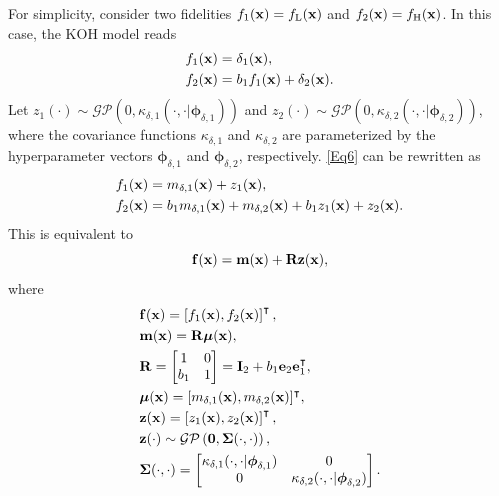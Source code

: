 \documentclass[iicol,sn-basic]{sn-jnl}%
\begin{document}
For simplicity, consider two fidelities $f_{1}({\bf x})=f_\text{L}({\bf x})$ and $f_{2}({\bf x})=f_\text{H}({\bf x})$.
In this case, the KOH model reads
\begin{subequations}\label{Eq6}
	\begin{align}
		f_1({\bf x}) & = \delta_1({\bf x}) 
		\label{Eq6-1},\\
		f_2({\bf x}) & = b_{1} f_{1}({\bf x}) + \delta_2({\bf x})
		\label{Eq6-2}.
	\end{align}
\end{subequations}
Let $z_1({\cdot}) \sim \mathcal{GP}\left(0,\kappa_{\delta,1}(\cdot,\cdot|{\boldsymbol \phi}_{\delta,1})\right)$ and $z_2({\cdot}) \sim \mathcal{GP}\left(0,\kappa_{\delta,2}(\cdot,\cdot|{\boldsymbol \phi}_{\delta,2})\right)$, where the covariance functions $\kappa_{\delta,1}$ and $\kappa_{\delta,2}$ are parameterized by the hyperparameter vectors ${\boldsymbol \phi}_{\delta,1}$ and ${\boldsymbol \phi}_{\delta,2}$, respectively.
\cref{Eq6} can be rewritten as
\begin{subequations}\label{Eq7}
	\begin{align}
		f_1({\bf x}) & = m_{\delta,1}({\bf x}) + z_1({\bf x}) 
		\label{Eq7-1},\\
		f_2({\bf x}) & = b_1  m_{\delta,1}({\bf x}) + m_{\delta,2}({\bf x}) + b_1 z_1({\bf x}) + z_2({\bf x})
		\label{Eq7-2}.
	\end{align}
\end{subequations}
This is equivalent to
\begin{equation}\label{Eq8}
	{\bf f}({\bf x}) =  {\bf m}({\bf x}) + {\bf R} {\bf z}({\bf x}),
\end{equation}
where
\begin{subequations}\label{Eq9}
	\begin{align}
		&{\bf f}({\bf x}) = \left[f_1({\bf x}),f_2({\bf x})\right]^\intercal 
		\label{Eq9-1},\\
		& {\bf m}({\bf x}) = {\bf R} \boldsymbol{\mu}({\bf x}), \label{Eq9-2}\\
		& {\bf R} = \left[\begin{matrix}
			1 & 0 \\
			b_1 & 1
		\end{matrix}\right] = {\bf I}_2 + b_1 {\bf e}_2 {\bf e}^\intercal_1, \label{Eq9-3}\\
		& \boldsymbol{\mu}({\bf x}) = [m_{\delta,1}({\bf x}),m_{\delta,2}({\bf x})]^\intercal,
		\label{Eq9-4}\\
		& {\bf z}({\bf x}) = \left[z_1({\bf x}),z_2({\bf x})\right]^\intercal, \label{Eq9-5}\\
		& {\bf z}(\cdot) \sim \mathcal{GP}\left({\bf 0},{\boldsymbol \Sigma}(\cdot,\cdot)\right),
		\label{Eq9-6}\\
		&{\boldsymbol \Sigma}(\cdot,\cdot) = \left[\begin{matrix}
			\kappa_{\delta,1}(\cdot,\cdot|{\boldsymbol \phi}_{\delta,1}) & 0 \\
			0 & \kappa_{\delta,2}(\cdot,\cdot|{\boldsymbol \phi}_{\delta,2})
		\end{matrix}\right] \label{Eq9-7}.
	\end{align}
\end{subequations}
\end{document}
